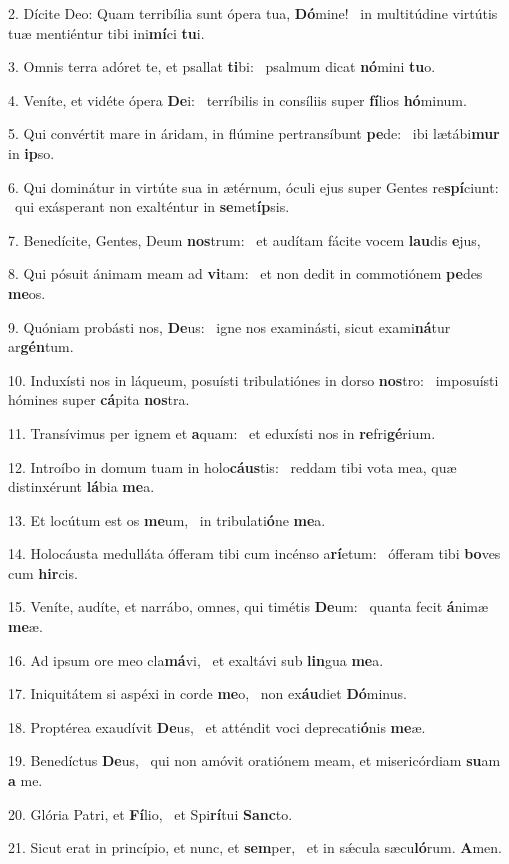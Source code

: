 2. Dícite Deo: Quam terribília sunt ópera tua, \textbf{Dó}mine! \ast\  in multitúdine virtútis tuæ mentiéntur tibi ini\textbf{mí}ci \textbf{tu}i.\

3. Omnis terra adóret te, et psallat \textbf{ti}bi: \ast\  psalmum dicat \textbf{nó}mini \textbf{tu}o.\

4. Veníte, et vidéte ópera \textbf{De}i: \ast\  terríbilis in consíliis super \textbf{fí}lios \textbf{hó}minum.\

5. Qui convértit mare in áridam, in flúmine pertransíbunt \textbf{pe}de: \ast\  ibi lætábi\textbf{mur} in \textbf{ip}so.\

6. Qui dominátur in virtúte sua in ætérnum, óculi ejus super Gentes re\textbf{spí}ciunt: \ast\  qui exásperant non exalténtur in \textbf{se}met\textbf{íp}sis.\

7. Benedícite, Gentes, Deum \textbf{nos}trum: \ast\  et audítam fácite vocem \textbf{lau}dis \textbf{e}jus,\

8. Qui pósuit ánimam meam ad \textbf{vi}tam: \ast\  et non dedit in commotiónem \textbf{pe}des \textbf{me}os.\

9. Quóniam probásti nos, \textbf{De}us: \ast\  igne nos examinásti, sicut exami\textbf{ná}tur ar\textbf{gén}tum.\

10. Induxísti nos in láqueum, posuísti tribulatiónes in dorso \textbf{nos}tro: \ast\  imposuísti hómines super \textbf{cá}pita \textbf{nos}tra.\

11. Transívimus per ignem et \textbf{a}quam: \ast\  et eduxísti nos in \textbf{re}fri\textbf{gé}rium.\

12. Introíbo in domum tuam in holo\textbf{cáus}tis: \ast\  reddam tibi vota mea, quæ distinxérunt \textbf{lá}bia \textbf{me}a.\

13. Et locútum est os \textbf{me}um, \ast\  in tribulati\textbf{ó}ne \textbf{me}a.\

14. Holocáusta medulláta ófferam tibi cum incénso a\textbf{rí}etum: \ast\  ófferam tibi \textbf{bo}ves cum \textbf{hir}cis.\

15. Veníte, audíte, et narrábo, omnes, qui timétis \textbf{De}um: \ast\  quanta fecit \textbf{á}nimæ \textbf{me}æ.\

16. Ad ipsum ore meo cla\textbf{má}vi, \ast\  et exaltávi sub \textbf{lin}gua \textbf{me}a.\

17. Iniquitátem si aspéxi in corde \textbf{me}o, \ast\  non ex\textbf{áu}diet \textbf{Dó}minus.\

18. Proptérea exaudívit \textbf{De}us, \ast\  et atténdit voci deprecati\textbf{ó}nis \textbf{me}æ.\

19. Benedíctus \textbf{De}us, \ast\  qui non amóvit oratiónem meam, et misericórdiam \textbf{su}am \textbf{a} me.\

20. Glória Patri, et \textbf{Fí}lio, \ast\  et Spi\textbf{rí}tui \textbf{Sanc}to.\

21. Sicut erat in princípio, et nunc, et \textbf{sem}per, \ast\  et in sǽcula sæcu\textbf{ló}rum. \textbf{A}men.\


